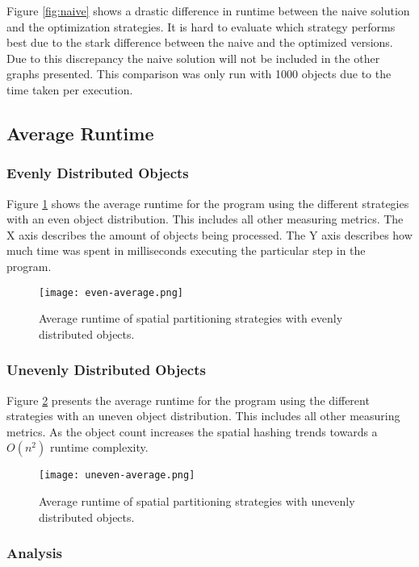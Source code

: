 \documentclass[a4paper, 12pt]{article}
\begin{document}
Figure \ref{fig:naive} shows a drastic difference in runtime between the naive
solution and the optimization strategies. It is hard to evaluate which strategy
performs best due to the stark difference between the naive and the optimized
versions. Due to this discrepancy the naive solution will not be included in the
other graphs presented. This comparison was only run with 1000 objects due to
the time taken per execution.

\subsection{Average Runtime}

\subsubsection{Evenly Distributed Objects}
Figure \ref{fig:even-average} shows the average runtime for the program
using the different strategies with an even object distribution. This includes
all other measuring metrics. The X axis describes the amount of objects being
processed. The Y axis describes how much time was spent in milliseconds
executing the particular step in the program.

\begin{figure}[H]
    \centering
    \texttt{[image: even-average.png]}
    \caption{Average runtime of spatial partitioning strategies with evenly
    distributed objects.}
    \label{fig:even-average}
\end{figure}

\subsubsection{Unevenly Distributed Objects}
Figure \ref{fig:uneven-average} presents the average runtime for the program
using the different strategies with an uneven object distribution. This includes
all other measuring metrics. As the object count increases the spatial hashing
trends towards a $O(n^2)$ runtime complexity.
\begin{figure}[H]
    \centering
    \texttt{[image: uneven-average.png]}
    \caption{Average runtime of spatial partitioning strategies with unevenly
    distributed objects.}
    \label{fig:uneven-average}
\end{figure}

\subsubsection{Analysis}
\end{document}
